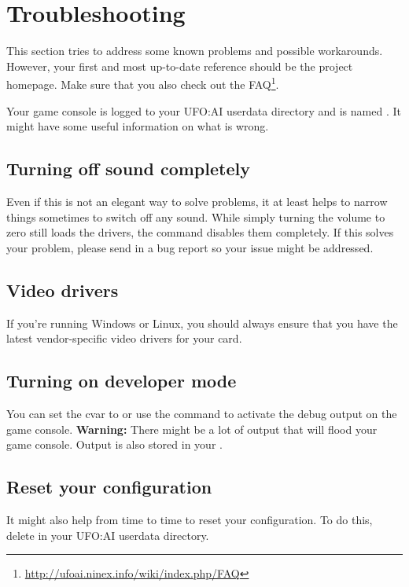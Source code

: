 \section{Troubleshooting}
This section tries to address some known problems and possible workarounds. However, your first and most up-to-date reference should be the project homepage. Make sure that you also check out the FAQ\footnote{\url{http://ufoai.ninex.info/wiki/index.php/FAQ}}.

Your game console is logged to your UFO:AI userdata directory and is named . It might have some useful information on what is wrong.

\subsection{Turning off sound completely}
Even if this is not an elegant way to solve problems, it at least helps to narrow things sometimes to switch off any sound. While simply turning the volume to zero still loads the drivers, the command   disables them completely. If this solves your problem, please send in a bug report so your issue might be addressed.

\subsection{Video drivers}
If you're running Windows or Linux, you should always ensure that you have the latest vendor-specific video drivers for your card.

\subsection{Turning on developer mode}
You can set the cvar  to  or use the  command to activate the debug output on the game console. \textbf{Warning:} There might be a lot of output that will flood your game console. Output is also stored in your .

\subsection{Reset your configuration}
It might also help from time to time to reset your configuration. To do this, delete  in your UFO:AI userdata directory.
